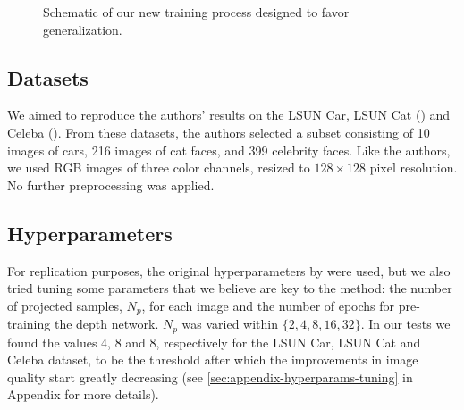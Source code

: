 \begin{figure}[!htb]
{}
    \caption{Schematic of our new training process designed to favor generalization.}
    \label{fig:trainerFlowchart}
\end{figure}

\subsection{Datasets}
We aimed to reproduce the authors' results on the LSUN Car, LSUN Cat (\cite{yu2015lsun}) and Celeba (\cite{celeba}). From these datasets, the authors selected a subset consisting of 10 images of cars, 216 images of cat faces, and 399 celebrity faces. Like the authors, we used RGB images of three color channels, resized to $128 \times 128$ pixel resolution. No further preprocessing was applied.
\subsection{Hyperparameters}
\label{sec:hyperparams}
For replication purposes, the original hyperparameters by \cite{gan2shape} were used, but we also tried tuning some parameters that we believe are key to the method: the number of projected samples, $N_p$, for each image and the number of epochs for pre-training the depth network. $N_p$ was varied within $\{2, 4, 8, 16, 32\}$. In our tests we found the values 4, 8 and 8, respectively for the LSUN Car, LSUN Cat and Celeba dataset, to be the threshold after which the improvements in image quality start greatly decreasing (see \autoref{sec:appendix-hyperparams-tuning} in Appendix for more details).

